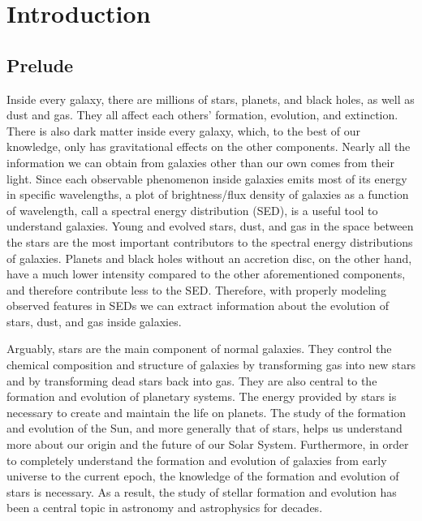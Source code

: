 
\chapter{Introduction}
\label{chap:intro}

\section{Prelude}
\label{sec: overview}
Inside every galaxy, there are millions of stars, planets, and black holes, as well as dust and gas.
They all affect each others' formation, evolution, and extinction.
There is also dark matter inside every galaxy, which, to the best of our knowledge, only has gravitational effects on the other components.
Nearly all the information we can obtain from galaxies other than our own comes from their light.
Since each observable phenomenon inside galaxies emits most of its energy in specific wavelengths, 
a plot of brightness/flux density of galaxies as a function of wavelength, call a spectral energy distribution (SED), is a useful tool to understand galaxies. 
Young and evolved stars, dust, and gas in the space between the stars are the most important contributors to the spectral energy distributions of galaxies.
Planets and black holes without an accretion disc, on the other hand, have a much lower intensity compared to the other aforementioned components, and therefore contribute less to the SED.
Therefore, with properly modeling observed features in SEDs we can extract information about the evolution of stars, dust, and gas inside galaxies.

Arguably, stars are the main component of normal galaxies.
They control the chemical composition and structure of galaxies by transforming gas into new stars and by transforming dead stars back into gas.
They are also central to the formation and evolution of planetary systems.
The energy provided by stars is necessary to create and maintain the life on planets. 
The study of the formation and evolution of the Sun, and more generally that of stars, helps us understand more about our origin and the future of our Solar System.
Furthermore, in order to completely understand the formation and evolution of galaxies from early universe to the current epoch, the knowledge of the formation and evolution of stars is necessary. 
As a result, the study of stellar formation and evolution has been a central topic in astronomy and astrophysics for decades.

